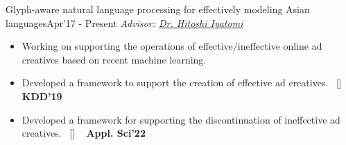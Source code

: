 \begin{projects}
\project
	{Glyph-aware natural language processing for effectively modeling Asian languages}{Apr'17 - Present}
	{
	    \textit{Advisor:  \href{https://iyatomi-lab.info/english/people/2013-6-8}{Dr. Hitoshi Iyatomi}}
	}
	{\begin{itemize}
	\setlength\itemsep{0.3em}
     \item Working on supporting the operations of effective/ineffective online ad creatives based on recent machine learning.
     \item Developed a framework to support the creation of effective ad creatives.~ [\href{https://github.com/shunk031/Multi-task-Conditional-Attention-Networks}{\small{\githubSymbol}}] ~ {\small{\lbrack\textbf{{KDD'19}}\rbrack}}
     \item Developed a framework for supporting the discontinuation of ineffective ad creatives.~ [\href{https://www.mdpi.com/2076-3417/12/7/3594}{\small{\websiteSymbol}}] ~ {\small{\lbrack\textbf{{Appl. Sci'22}}\rbrack}}
     \end{itemize}}     

\end{projects}    

